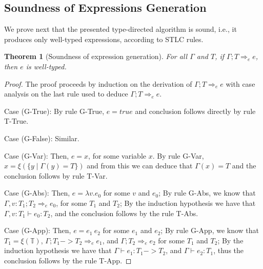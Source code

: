 \documentclass[tese,capa,english]{texufpel}
\newtheorem{theorem}{Theorem}
\begin{document}
\subsection{Soundness of Expressions Generation}

We prove next that the presented type-directed algorithm is sound, i.e., it produces only well-typed expressions, according to STLC rules.

\begin{theorem}[Soundness of expression generation]
For all $\Gamma$ and $T$, if $\Gamma ; T \Rightarrow_e e$, then $e$ is well-typed.
\end{theorem}

\begin{proof}
  The proof proceeds by induction on the derivation of $\Gamma ; T \Rightarrow_e e$ with case analysis on the last rule used to deduce $\Gamma ; T \Rightarrow_e e$. 

Case (G-True): By rule {\footnotesize\textrm{G-True}}, $e = true$ and conclusion follows directly by rule {\footnotesize\textrm{T-True}}.
  
\vspace{5pt}

Case (G-False): Similar.
  
\vspace{5pt}

Case (G-Var): Then, $e = x$, for some variable $x$. By rule {\footnotesize\textrm{G-Var}}, $x = \xi(\{y \mid \Gamma(y) = T\})$ and from this we can deduce that $\Gamma(x) = T$ and the conclusion follows by rule {\footnotesize\textrm{T-Var}}.

\vspace{5pt}

Case (G-Abs): Then, $e = \lambda v . e_0$ for some $v$ and $e_0$; By rule {\footnotesize\textrm{G-Abs}}, we know that $\Gamma , v : T_1 ; T_2 \Rightarrow_e e_0$, for some $T_1$ and $T_2$; By the induction hypothesis we have that $\Gamma , v : T_1 \vdash e_0 : T_2$, and the conclusion follows by the rule {\footnotesize\textrm{T-Abs}}.
\vspace{5pt}

Case (G-App): Then, $e = e_1 ~ e_2$ for some $e_1$ and $e_2$; By rule {\footnotesize\textrm{G-App}}, we know that $T_1 = \xi(\mathbb{T})$, $\Gamma ; T_1 -> T_2 \Rightarrow_e e_1$, and $\Gamma ; T_2 \Rightarrow_e e_2$ for some $T_1$ and $T_2$; By the induction hypothesis we have that $\Gamma \vdash e_1 : T_1 -> T_2$, and $\Gamma \vdash e_2 : T_1$, thus the conclusion follows by the rule {\footnotesize\textrm{T-App}}.
\end{proof}
\end{document}
